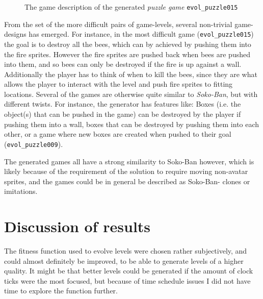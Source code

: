 \documentclass[a4paper,titlepage,final]{report}
\begin{document}
\begin{figure}[!ht]
\centering
{}
\caption{The game description of the generated \textit{puzzle game} \texttt{evol_puzzle015}}
\label{fig:evol_puzzle_desc}
\end{figure}


From the set of the more difficult pairs of game-levels, several non-trivial game-designs has emerged.
For instance, in the most difficult game (\texttt{evol_puzzle015}) the goal is to destroy all the bees, which can by achieved by pushing them into the fire sprites.
However the fire sprites are pushed back when bees are pushed into them, and so bees can only be destroyed if the fire is up against a wall.
Additionally the player has to think of when to kill the bees, since they are what allows the player to interact with the level and push fire sprites to fitting locations.
Several of the games are otherwise quite similar to \textit{Soko-Ban}, but with different twists.
For instance, the generator has features like: 
Boxes (i.e. the object(s) that can be pushed in the game) can be destroyed by the player if pushing them into a wall, boxes that can be destroyed by pushing them into each other, or a game where new boxes are created when pushed to their goal (\texttt{evol_puzzle009}).

The generated games all have a strong similarity to Soko-Ban however, which is likely because of the requirement of the solution to require moving non-avatar sprites, and the games could be in general be described as Soko-Ban- clones or imitations.

\section{Discussion of results} 
\label{sec_task3discussion}
The fitness function used to evolve levels were chosen rather subjectively, and could almost definitely be improved, to be able to generate levels of a higher quality.
It might be that better levels could be generated if the amount of clock ticks were the most focused, but because of time schedule issues I did not have time to explore the function further.
\end{document}
